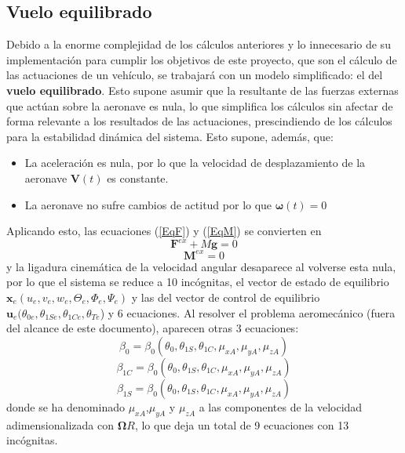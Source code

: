 \subsection{Vuelo equilibrado}

Debido a la enorme complejidad de los cálculos anteriores y lo innecesario de su implementación para cumplir los objetivos de este proyecto, que son el cálculo de las actuaciones de un vehículo, se trabajará con un modelo simplificado: el del \textbf{vuelo equilibrado}. Esto supone asumir que la resultante de las fuerzas externas que actúan sobre la aeronave es nula, lo que simplifica los cálculos sin afectar de forma relevante a los resultados de las actuaciones, prescindiendo de los cálculos para la estabilidad dinámica del sistema.
Esto supone, además, que:
\begin{itemize}
	\item La aceleración es nula, por lo que la velocidad de desplazamiento de la aeronave $\mathrm{\textbf{V}}(t)$ es constante.
	\item La aeronave no sufre cambios de actitud por lo que $\boldsymbol{\omega}(t)=0$
\end{itemize}
Aplicando esto, las ecuaciones (\ref{EqF}) y (\ref{EqM}) se convierten en
\begin{equation}
	\mathrm{\textbf{F}}^{ex}+M\mathrm{\textbf{g}}=0
	\label{EqFe}
\end{equation}
\begin{equation}
	\mathrm{\textbf{M}}^{ex}=0
	\label{EqMe}
\end{equation}
y la ligadura cinemática de la velocidad angular desaparece al volverse esta nula, por lo que el sistema se reduce a 10 incógnitas, el vector de estado de equilibrio $\mathrm{\textbf{x}}_e(u_e, v_e, w_e, \Theta_e, \Phi_e, \Psi_e)$ y las del vector de control de equilibrio $\mathrm{\textbf{u}}_e(\theta_{0e}, \theta_{1Se}, \theta_{1Ce}, \theta_{Te}$) y 6 ecuaciones.
Al resolver el problema aeromecánico (fuera del alcance de este documento), aparecen otras 3 ecuaciones:
\begin{equation}
\beta_0=\beta_0(\theta_0,\theta_{1S},\theta_{1C},\mu_{xA},\mu_{yA},\mu_{zA})
\label{beta0}
\end{equation}
\begin{equation}
\beta_{1C}=\beta_0(\theta_0,\theta_{1S},\theta_{1C},\mu_{xA},\mu_{yA},\mu_{zA})
\label{beta1c}
\end{equation}
\begin{equation}
\beta_{1S}=\beta_0(\theta_0,\theta_{1S},\theta_{1C},\mu_{xA},\mu_{yA},\mu_{zA})
\label{beta1s}
\end{equation}
donde se ha denominado $\mu_{xA}$,$\mu_{yA}$ y $\mu_{zA}$ a las componentes de la velocidad adimensionalizada con $\boldsymbol{\Omega}R$, lo que deja un total de 9 ecuaciones con 13 incógnitas.

